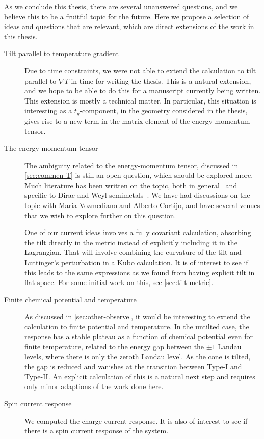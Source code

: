 As we conclude this thesis, there are several unanswered questions, and we believe this to be a fruitful topic for the future.
Here we propose a selection of ideas and questions that are relevant, which are direct extensions of the work in this thesis.
\begin{description}
  \item[Tilt parallel to temperature gradient]
        Due to time constraints, we were not able to extend the calculation to tilt parallel to \( \nabla T \) in time for writing the thesis.
        This is a natural extension, and we hope to be able to do this for a manuscript currently being written.
        This extension is mostly a technical matter.
        In particular, this situation is interesting as a \( t_y \)-component, in the geometry considered in the thesis, gives rise to a new term in the matrix element of the energy-momentum tensor.

  \item[The energy-momentum tensor]
        The ambiguity related to the energy\hyp{}momentum tensor, discussed in \cref{sec:commen-T} is still an open question, which should be explored more.
        Much literature has been written on the topic, both in general~\cite{forgerCurrentsEnergyMomentumTensor2004} and specific to Dirac and Weyl semimetals~\cite{vanderwurffMagnetovorticalThermoelectricTransport2019,arjonaFingerprintsConformalAnomaly2019}.
        We have had discussions on the topic with María Vozmediano and Alberto Cortijo, and have several venues that we wish to explore further on this question.

        One of our current ideas involves a fully covariant calculation, absorbing the tilt directly in the metric instead of explicitly including it in the Lagrangian.
        That will involve combining the curvature of the tilt and Luttinger's perturbation in a Kubo calculation.
        It is of interest to see if this leads to the same expressions as we found from having explicit tilt in flat space.
        For some initial work on this, see \cref{sec:tilt-metric}.


  \item[Finite chemical potential and temperature]
        As discussed in \cref{sec:other-observe}, it would be interesting to extend the calculation to finite potential and temperature.
        In the untilted case, the response has a stable plateau as a function of chemical potential even for finite temperature, related to the energy gap between the \( \pm 1 \) Landau levels, where there is only the zeroth Landau level.
        As the cone is tilted, the gap is reduced and vanishes at the transition between Type-I and Type-II.
        An explicit calculation of this is a natural next step and requires only minor adaptions of the work done here.

  \item[Spin current response] We computed the charge current response.
        It is also of interest to see if there is a spin current response of the system.

\end{description}
